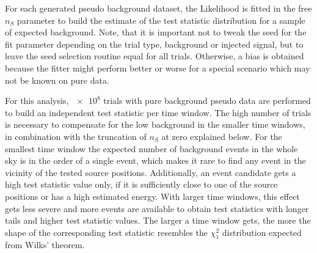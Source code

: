 For each generated pseudo background dataset, the Likelihood is fitted in the free $n_S$ parameter to build the estimate of the test statistic distribution for a sample of expected background.
Note, that it is important not to tweak the seed for the fit parameter depending on the trial type, background or injected signal, but to leave the seed selection routine equal for all trials.
Otherwise, a bias is obtained because the fitter might perform better or worse for a special scenario which may not be known on pure data.

For this analysis, $\num{e8}$ trials with pure background pseudo data are performed to build an independent test statistic per time window.
The high number of trials is necessary to compensate for the low background in the smaller time windows, in combination with the truncation of $n_S$ at zero explained below.
For the smallest time window the expected number of background events in the whole sky is in the order of a single event, which makes it rare to find any event in the vicinity of the tested source positions.
Additionally, an event candidate gets a high test statistic value only, if it is sufficiently close to one of the source positions or has a high estimated energy.
With larger time windows, this effect gets less severe and more events are available to obtain test statistics with longer tails and higher test statistic values.
The larger a time window gets, the more the shape of the corresponding test statistic resembles the $\chi^2_1$ distribution expected from Wilks' theorem.

